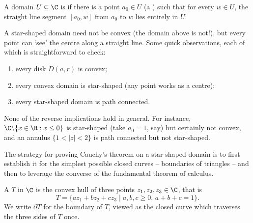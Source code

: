 \begin{definition}
    A domain $U \subseteq \C$ is  if there is a point $a_0 \in U$ (a ) such that for every $w \in U$, the straight line segment $[a_0, w]$ from $a_0$ to $w$ lies entirely in $U$.
\end{definition}

\begin{center}
\end{center}

A star-shaped domain need not be convex (the domain above is not!), but every point can `see' the centre along a straight line. Some quick observations, each of which is straightforward to check:
\begin{enumerate}[label=(\roman*)]
    \item every disk $D(a, r)$ is convex;
    \item every convex domain is star-shaped (any point works as a centre);
    \item every star-shaped domain is path connected.
\end{enumerate}
None of the reverse implications hold in general. For instance, $\C \backslash \{x \in \R : x \leq 0\}$ is star-shaped (take $a_0 = 1$, say) but certainly not convex, and an annulus $\{1 < |z| < 2\}$ is path connected but not star-shaped.

The strategy for proving Cauchy's theorem on a star-shaped domain is to first establish it for the simplest possible closed curves -- boundaries of triangles -- and then to leverage the converse of the fundamental theorem of calculus.

\begin{definition}[Triangle]
    A  $T$ in $\C$ is the convex hull of three points $z_1, z_2, z_3 \in \C$, that is
    $$
    T = \{a z_1 + b z_2 + c z_3 \mid a, b, c \geq 0, \, a + b + c = 1\}.
    $$
    We write $\partial T$ for the boundary of $T$, viewed as the closed curve which traverses the three sides of $T$ once.
\end{definition}

